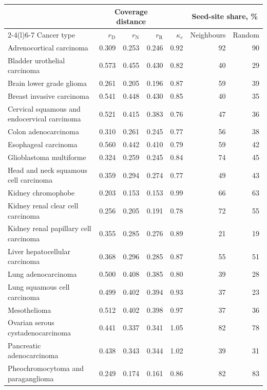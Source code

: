 \begin{table}[htbp]
\centering
\footnotesize
\renewcommand{\arraystretch}{1.1}
\begin{tabular}{@{}lrrrrrr@{}}
\toprule
 & \multicolumn{3}{c}{Coverage distance} & & \multicolumn{2}{c}{Seed-site share, \%} \\
\cmidrule(lr){2-4}\cmidrule(l){6-7}
Cancer type & $r_{\mathrm D}$ & $r_{\mathrm N}$ & $r_{\mathrm R}$ & $\kappa_c$ & Neighbours & Random \\
\midrule
Adrenocortical carcinoma & 0.309 & 0.253 & 0.246 & 0.92 & 92 & 90 \\
Bladder urothelial carcinoma & 0.573 & 0.455 & 0.430 & 0.82 & 40 & 29 \\
Brain lower grade glioma & 0.261 & 0.205 & 0.196 & 0.87 & 59 & 39 \\
Breast invasive carcinoma & 0.541 & 0.448 & 0.430 & 0.85 & 40 & 35 \\
Cervical squamous and endocervical carcinoma & 0.521 & 0.415 & 0.383 & 0.76 & 47 & 36 \\
Colon adenocarcinoma & 0.310 & 0.261 & 0.245 & 0.77 & 56 & 38 \\
Esophageal carcinoma & 0.560 & 0.442 & 0.410 & 0.79 & 59 & 42 \\
Glioblastoma multiforme & 0.324 & 0.259 & 0.245 & 0.84 & 74 & 45 \\
Head and neck squamous cell carcinoma & 0.359 & 0.294 & 0.274 & 0.77 & 49 & 43 \\
Kidney chromophobe & 0.203 & 0.153 & 0.153 & 0.99 & 66 & 63 \\
Kidney renal clear cell carcinoma & 0.256 & 0.205 & 0.191 & 0.78 & 72 & 55 \\
Kidney renal papillary cell carcinoma & 0.355 & 0.285 & 0.276 & 0.89 & 21 & 19 \\
Liver hepatocellular carcinoma & 0.368 & 0.296 & 0.285 & 0.87 & 55 & 51 \\
Lung adenocarcinoma & 0.500 & 0.408 & 0.385 & 0.80 & 39 & 28 \\
Lung squamous cell carcinoma & 0.499 & 0.402 & 0.394 & 0.93 & 37 & 23 \\
Mesothelioma & 0.512 & 0.402 & 0.398 & 0.97 & 37 & 36 \\
Ovarian serous cystadenocarcinoma & 0.441 & 0.337 & 0.341 & 1.05 & 82 & 78 \\
Pancreatic adenocarcinoma & 0.438 & 0.343 & 0.344 & 1.02 & 39 & 31 \\
Pheochromocytoma and paraganglioma & 0.249 & 0.174 & 0.161 & 0.86 & 82 & 83 \\

\end{tabular}
\end{table}
